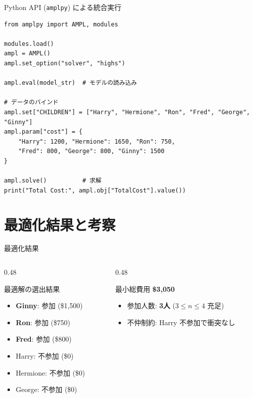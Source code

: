 \documentclass[aspectratio=169,11pt]{beamer}
\begin{document}
\begin{frame}[fragile]{Python API (\texttt{amplpy}) による統合実行}
\begin{lstlisting}[basicstyle=\ttfamily\fontsize{7.5pt}{8.5pt}\selectfont]
from amplpy import AMPL, modules

modules.load()
ampl = AMPL()
ampl.set_option("solver", "highs")

ampl.eval(model_str)  # モデルの読み込み

# データのバインド
ampl.set["CHILDREN"] = ["Harry", "Hermione", "Ron", "Fred", "George", "Ginny"]
ampl.param["cost"] = {
    "Harry": 1200, "Hermione": 1650, "Ron": 750,
    "Fred": 800, "George": 800, "Ginny": 1500
}

ampl.solve()          # 求解
print("Total Cost:", ampl.obj["TotalCost"].value())
\end{lstlisting}
\end{frame}

\section{最適化結果と考察}

\begin{frame}{最適化結果}
  \begin{columns}[T]
    \begin{column}{0.48\textwidth}
      \begin{block}{最適解の選出結果}
        \begin{itemize}
          \item \textbf{Ginny}: \alert{参加} (\$1,500)
          \item \textbf{Ron}: \alert{参加} (\$750)
          \item \textbf{Fred}: \alert{参加} (\$800)
          \item Harry: 不参加 (\$0)
          \item Hermione: 不参加 (\$0)
          \item George: 不参加 (\$0)
        \end{itemize}
      \end{block}
    \end{column}
    \begin{column}{0.48\textwidth}
      \begin{alertblock}{最小総費用}
        \centering
        \vspace{0.2cm}
        {\Huge \textbf{\$3,050}}
        \vspace{0.2cm}
      \end{alertblock}
      \begin{itemize}\small
        \item 参加人数: \textbf{3人} ($3 \le n \le 4$ 充足)
        \item 不仲制約: Harry 不参加で衝突なし
      \end{itemize}
    \end{column}
  \end{columns}
\end{frame}
\end{document}
